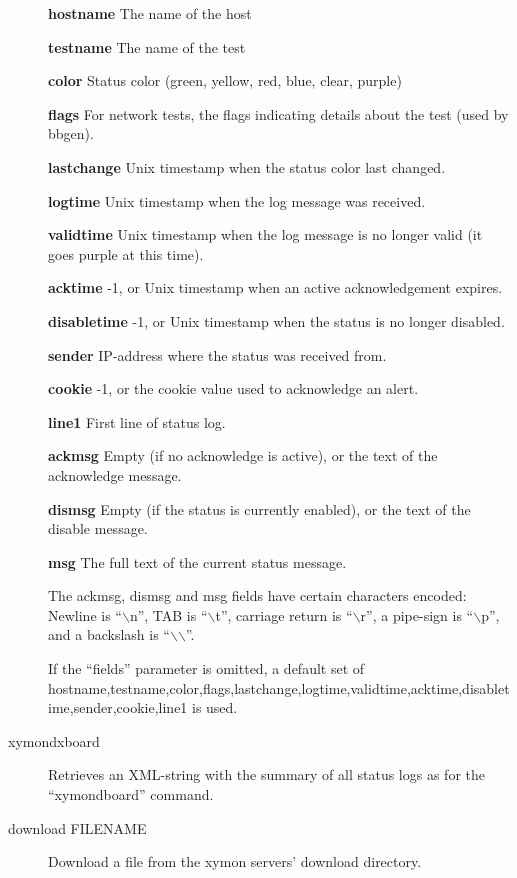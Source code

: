 \begin{description}
 \textbf{hostname}
 The name of the host 


 \textbf{testname}
 The name of the test 


 \textbf{color}
 Status color (green, yellow, red, blue, clear, purple) 


 \textbf{flags}
 For network tests, the flags indicating details about the test (used by bbgen). 


 \textbf{lastchange}
 Unix timestamp when the status color last changed. 


 \textbf{logtime}
 Unix timestamp when the log message was received. 


 \textbf{validtime}
 Unix timestamp when the log message is no longer valid (it goes purple at this time). 


 \textbf{acktime}
 -1, or Unix timestamp when an active acknowledgement expires. 


 \textbf{disabletime}
 -1, or Unix timestamp when the status is no longer disabled. 


 \textbf{sender}
 IP-address where the status was received from. 


 \textbf{cookie}
 -1, or the cookie value used to acknowledge an alert. 


 \textbf{line1}
 First line of status log. 


 \textbf{ackmsg}
 Empty (if no acknowledge is active), or the text of the acknowledge message. 


 \textbf{dismsg}
 Empty (if the status is currently enabled), or the text of the disable message. 


 \textbf{msg}
 The full text of the current status message. 

  The ackmsg, dismsg and msg fields have certain characters encoded:
  Newline is ``$\backslash$n'', TAB is ``$\backslash$t'', carriage
  return is ``$\backslash$r'', a pipe-sign is ``$\backslash$p'', and a
  backslash is ``$\backslash$$\backslash$''. 



  If the ``fields'' parameter is omitted, a default set of
  hostname,testname,color,flags,lastchange,logtime,validtime,acktime,disabletime,sender,cookie,line1
  is used. 

\item[xymondxboard] Retrieves an XML-string with the summary of all
  status logs as for the ``xymondboard'' command. 



 

\item[download FILENAME] Download a file from the xymon servers' download directory. 


\end{description}
